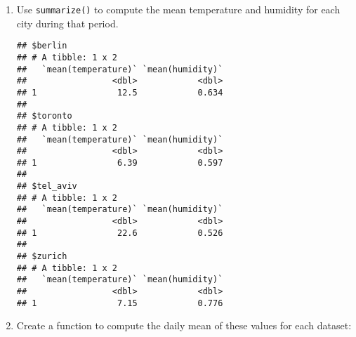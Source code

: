 \documentclass[]{book}
\newenvironment{Shaded}{\begin{snugshade}}{\end{snugshade}}
\newcommand{\KeywordTok}[1]{\textcolor[rgb]{0.13,0.29,0.53}{\textbf{#1}}}
\newcommand{\NormalTok}[1]{#1}
\newcommand{\OperatorTok}[1]{\textcolor[rgb]{0.81,0.36,0.00}{\textbf{#1}}}
\newcommand{\StringTok}[1]{\textcolor[rgb]{0.31,0.60,0.02}{#1}}
\begin{document}
\begin{enumerate}
\def\labelenumi{\arabic{enumi}.}
\item
  Use \texttt{summarize()} to compute the mean temperature and humidity for each city during that period.

\begin{Shaded}
\end{Shaded}

\begin{verbatim}
## $berlin
## # A tibble: 1 x 2
##   `mean(temperature)` `mean(humidity)`
##                 <dbl>            <dbl>
## 1                12.5            0.634
## 
## $toronto
## # A tibble: 1 x 2
##   `mean(temperature)` `mean(humidity)`
##                 <dbl>            <dbl>
## 1                6.39            0.597
## 
## $tel_aviv
## # A tibble: 1 x 2
##   `mean(temperature)` `mean(humidity)`
##                 <dbl>            <dbl>
## 1                22.6            0.526
## 
## $zurich
## # A tibble: 1 x 2
##   `mean(temperature)` `mean(humidity)`
##                 <dbl>            <dbl>
## 1                7.15            0.776
\end{verbatim}
\item
  Create a function to compute the daily mean of these values for each dataset:

\begin{Shaded}
\end{Shaded}


\end{enumerate}
\end{document}
